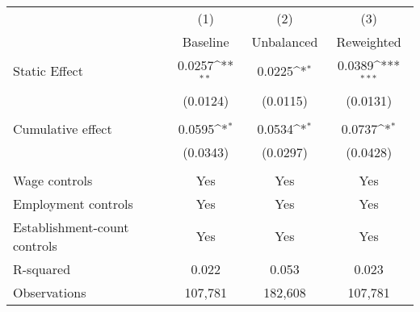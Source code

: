 {
\def\sym#1{\ifmmode^{#1}\else\(^{#1}\)\fi}
\begin{tabular}{l*{3}{c}}
\hline\hline
          &\multicolumn{1}{c}{(1)}&\multicolumn{1}{c}{(2)}&\multicolumn{1}{c}{(3)}\\
          &\multicolumn{1}{c}{Baseline}&\multicolumn{1}{c}{Unbalanced}&\multicolumn{1}{c}{Reweighted}\\
\hline
Static Effect&   0.0257\sym{**} &   0.0225\sym{*}  &   0.0389\sym{***}\\
          & (0.0124)         & (0.0115)         & (0.0131)         \\
\hline
\vspace{-1mm}&                  &                  &                  \\
Cumulative effect&0.0595\sym{*}         &0.0534\sym{*}         &0.0737\sym{*}         \\
          & (0.0343)         & (0.0297)         & (0.0428)         \\
\hline    &                  &                  &                  \\
Wage controls&      Yes         &      Yes         &      Yes         \\
Employment controls&      Yes         &      Yes         &      Yes         \\
Establishment-count controls&      Yes         &      Yes         &      Yes         \\
R-squared &    0.022         &    0.053         &    0.023         \\
Observations&  107,781         &  182,608         &  107,781         \\
\hline\hline
\end{tabular}
}
